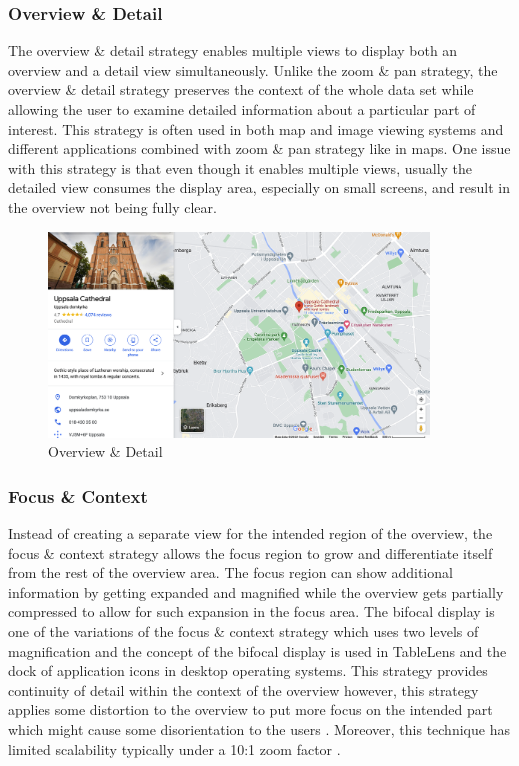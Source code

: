 \subsubsection{Overview \& Detail}

The overview \& detail strategy enables multiple views to display both an overview and a detail view simultaneously. Unlike the zoom \& pan strategy, the overview \& detail strategy preserves the context of the whole data set while allowing the user to examine detailed information about a particular part of interest. This strategy is often used in both map and image viewing systems \cite{plaisant1995image} and different applications combined with zoom \& pan strategy like in maps. One issue with this strategy is that even though it enables multiple views, usually the detailed view consumes the display area, especially on small screens, and result in the overview not being fully clear.

\begin{figure}[H]
\centering
\captionsetup{justification=centering}
\includegraphics[width=0.9\textwidth]{Report-latex/tex_files/pics/over.png}
\caption{Overview \& Detail \cite{googlemap}}
\label{fig:overview\&detail}
\end{figure}

\subsubsection{Focus \& Context}

Instead of creating a separate view for the intended region of the overview, the focus \& context strategy allows the focus region to grow and differentiate itself from the rest of the overview area. The focus region can show additional information by getting expanded and magnified while the overview gets partially compressed to allow for such expansion in the focus area. The bifocal display is one of the variations of the focus \& context strategy which uses two levels of magnification and the concept of the bifocal display is used in TableLens \cite{rao1994table} and the dock of application icons in desktop operating systems. This strategy provides continuity of detail within the context of the overview however, this strategy applies some distortion to the overview to put more focus on the intended part which might cause some disorientation to the users \cite{baudisch2002keeping}. Moreover, this technique has limited scalability typically under a 10:1 zoom factor \cite{salvendy2012handbook}.

